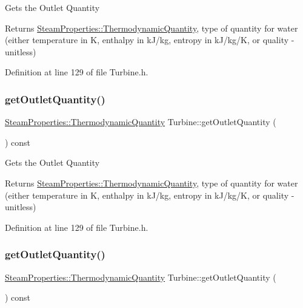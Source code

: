 Gets the Outlet Quantity

\begin{DoxyReturn}{Returns}
\hyperlink{class_steam_properties_ae0294bedf7d178c2d8fb6aed0f62fbff}{Steam\+Properties\+::\+Thermodynamic\+Quantity}, type of quantity for water (either temperature in K, enthalpy in k\+J/kg, entropy in k\+J/kg/K, or quality -\/ unitless) 
\end{DoxyReturn}


Definition at line 129 of file Turbine.\+h.

\mbox{\label{class_turbine_acd3e98ab67754b652de97498d9bec6d2}} 
\subsubsection{\texorpdfstring{get\+Outlet\+Quantity()}{getOutletQuantity()}\hspace{0.1cm}{\footnotesize\ttfamily [2/3]}}
{\footnotesize\ttfamily \hyperlink{class_steam_properties_ae0294bedf7d178c2d8fb6aed0f62fbff}{Steam\+Properties\+::\+Thermodynamic\+Quantity} Turbine\+::get\+Outlet\+Quantity (\begin{DoxyParamCaption}{ }\end{DoxyParamCaption}) const\hspace{0.3cm}{\ttfamily [inline]}}

Gets the Outlet Quantity

\begin{DoxyReturn}{Returns}
\hyperlink{class_steam_properties_ae0294bedf7d178c2d8fb6aed0f62fbff}{Steam\+Properties\+::\+Thermodynamic\+Quantity}, type of quantity for water (either temperature in K, enthalpy in k\+J/kg, entropy in k\+J/kg/K, or quality -\/ unitless) 
\end{DoxyReturn}


Definition at line 129 of file Turbine.\+h.

\mbox{\label{class_turbine_acd3e98ab67754b652de97498d9bec6d2}} 
\subsubsection{\texorpdfstring{get\+Outlet\+Quantity()}{getOutletQuantity()}\hspace{0.1cm}{\footnotesize\ttfamily [3/3]}}
{\footnotesize\ttfamily \hyperlink{class_steam_properties_ae0294bedf7d178c2d8fb6aed0f62fbff}{Steam\+Properties\+::\+Thermodynamic\+Quantity} Turbine\+::get\+Outlet\+Quantity (\begin{DoxyParamCaption}{ }\end{DoxyParamCaption}) const\hspace{0.3cm}{\ttfamily [inline]}}

